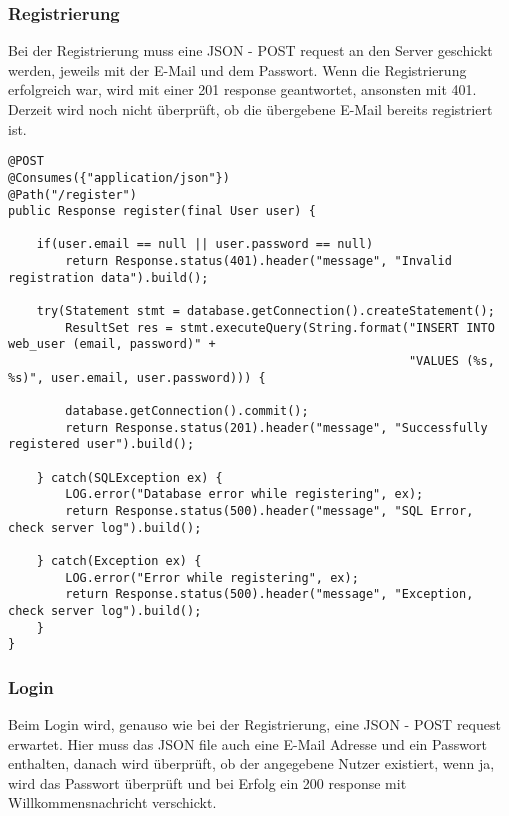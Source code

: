 \subsubsection{Registrierung}

Bei der Registrierung muss eine JSON - POST request an den Server geschickt werden, jeweils mit der E-Mail und dem Passwort. Wenn die Registrierung erfolgreich war, wird mit einer 201 response geantwortet, ansonsten mit 401.\\
Derzeit wird noch nicht überprüft, ob die übergebene E-Mail bereits registriert ist.

\begin{lstlisting}[style=Java, caption=REST User Registration]
@POST
@Consumes({"application/json"})
@Path("/register")
public Response register(final User user) {

    if(user.email == null || user.password == null)
        return Response.status(401).header("message", "Invalid registration data").build();

    try(Statement stmt = database.getConnection().createStatement();
        ResultSet res = stmt.executeQuery(String.format("INSERT INTO web_user (email, password)" +
                                                        "VALUES (%s, %s)", user.email, user.password))) {

        database.getConnection().commit();
        return Response.status(201).header("message", "Successfully registered user").build();

    } catch(SQLException ex) {
        LOG.error("Database error while registering", ex);
        return Response.status(500).header("message", "SQL Error, check server log").build();

    } catch(Exception ex) {
        LOG.error("Error while registering", ex);
        return Response.status(500).header("message", "Exception, check server log").build();
    }
}
\end{lstlisting}

\subsubsection{Login}

Beim Login wird, genauso wie bei der Registrierung, eine JSON - POST request erwartet. Hier muss das JSON file auch eine E-Mail Adresse und ein Passwort enthalten, danach wird überprüft, ob der angegebene Nutzer existiert, wenn ja, wird das Passwort überprüft und bei Erfolg ein 200 response mit Willkommensnachricht verschickt.

